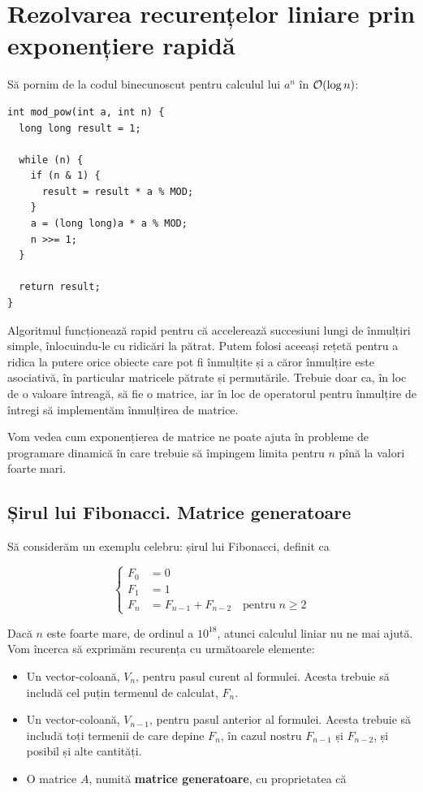 \documentclass[../main.tex]{subfiles}
\begin{document}
\chapter{Rezolvarea recurențelor liniare prin exponențiere rapidă}

Să pornim de la codul binecunoscut pentru calculul lui $a^n$ în $\mathcal{O}(\log n)$:

\begin{verbatim}
int mod_pow(int a, int n) {
  long long result = 1;

  while (n) {
    if (n & 1) {
      result = result * a % MOD;
    }
    a = (long long)a * a % MOD;
    n >>= 1;
  }

  return result;
}
\end{verbatim}

Algoritmul funcționează rapid pentru că accelerează succesiuni lungi de înmulțiri simple, înlocuindu-le cu ridicări la pătrat. Putem folosi aceeași rețetă pentru a ridica la putere orice obiecte care pot fi înmulțite și a căror înmulțire este asociativă, în particular matricele pătrate și permutările. Trebuie doar ca, în loc de o valoare întreagă,  să fie o matrice, iar în loc de operatorul \ccode{*} pentru înmulțire de întregi să implementăm înmulțirea de matrice.

Vom vedea cum exponențierea de matrice ne poate ajuta în probleme de programare dinamică în care trebuie să împingem limita pentru $n$ pînă la valori foarte mari.

\section{Șirul lui Fibonacci. Matrice generatoare}

Să considerăm un exemplu celebru: șirul lui Fibonacci, definit ca

$$
\begin{cases}
  F_0 &= 0 \\
  F_1 &= 1 \\
  F_n &= F_{n-1} + F_{n-2} \quad \textrm{pentru} \; n \geq 2
\end{cases}
$$

Dacă $n$ este foarte mare, de ordinul a $10^{18}$, atunci calculul liniar nu ne mai ajută. Vom încerca să exprimăm recurența cu următoarele elemente:

\begin{itemize}
  \item Un vector-coloană, $V_n$, pentru pasul curent al formulei. Acesta trebuie să includă cel puțin termenul de calculat, $F_n$.
  \item Un vector-coloană, $V_{n-1}$, pentru pasul anterior al formulei. Acesta trebuie să includă toți termenii de care depine $F_n$, în cazul nostru $F_{n-1}$ și $F_{n-2}$, și posibil și alte cantități.
  \item O matrice $A$, numită \textbf{matrice generatoare}, cu proprietatea că
\end{itemize}
\end{document}
